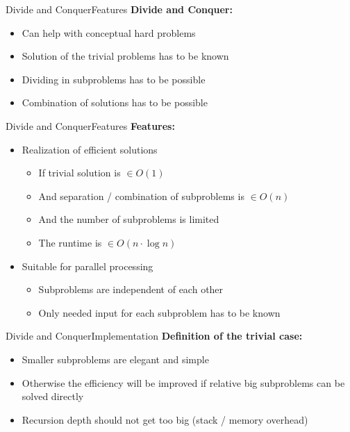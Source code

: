 \begin{frame}{Divide and Conquer}{Features}
  \textbf{Divide and Conquer:}
  \begin{itemize}
    \item<2-| handout: 1>
      Can help with conceptual hard problems
    \item<3-| handout: 1>
      {\color{MainA}Solution} of the trivial problems has to be known
    \item<4-| handout: 1>
      {\color{MainA}Dividing} in subproblems has to be possible
    \item<5-| handout: 1>
      {\color{MainA}Combination} of solutions has to be possible
  \end{itemize}
\end{frame}


\begin{frame}{Divide and Conquer}{Features}
  \textbf{Features:}
  \begin{itemize}
    \item<1->
      Realization of {\color{MainA}efficient solutions}
      \begin{itemize}
        \item<2->
          If trivial solution is {\color{MainA}$\in O(1)$}
        \item<3->
          And separation / combination of subproblems is
          {\color{MainA}$\in O(n)$}
        \item<4->
          And the number of subproblems is limited
        \item<5->
          The runtime is {\color{MainA}$\in O(n \cdot \log n)$}
      \end{itemize}
    \item<6->
      Suitable for parallel processing
      \begin{itemize}
        \item<7->
          Subproblems are {\color{MainA}independent} of each other
        \item<8->
          Only needed input for each subproblem has to be known
      \end{itemize}
  \end{itemize}
\end{frame}


\begin{frame}{Divide and Conquer}{Implementation}
  \textbf{Definition of the trivial case:}
  \begin{itemize}
    \item<2->
      Smaller subproblems are elegant and simple
    \item<3->
      Otherwise the efficiency will be improved if relative big subproblems
      can be solved directly
    \item<4->
      Recursion depth should not get too big (stack / memory overhead)
  \end{itemize}
\end{frame}

